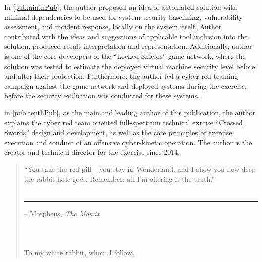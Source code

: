 \begin{contriblist}
\item In \ref{pub:ninthPub}, the author proposed an idea of automated solution with minimal dependencies to be used for system security baselining, vulnerability assessment, and incident response, locally on the system itself. Author contributed with the ideas and suggestions of applicable tool inclusion into the solution, produced result interpretation and representation. Additionally, author is one of the core developers of the ``Locked Shields'' game network, where the solution was tested to estimate the deployed virtual machine security level before and after their protection. Furthermore, the author led a cyber red teaming campaign against the game network and deployed systems during the exercise, before the security evaluation was conducted for these systems.
\item in \ref{pub:tenthPub}, as the main and leading author of this publication, the author explains the cyber red team oriented full-spectrum technical exrcise ``Crossed Swords'' design and development, as well as the core principles of exercise execution and conduct of an offensive cyber-kinetic operation. The author is the creator and technical director for the exercise since 2014.
\end{contriblist}



\printglossary[type=\acronymtype]
{}

\clearpage
\listoffigures
{} 

\clearpage
\listoftables
{} 

\oddpagesection*{}
\vspace{6cm}
\begin{quotation}
``You take the red pill -- you stay in Wonderland, and I show you how deep the rabbit hole goes. Remember: all I'm offering is the truth.'' \\ \\
\rule{7cm}{0pt} -- Morpheus, \textit{The Matrix} \\ \\ \\ \\

To my white rabbit, whom I follow.
\end{quotation}

